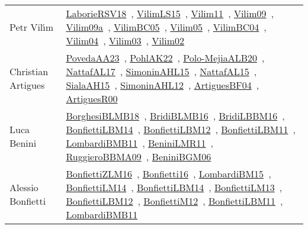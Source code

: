 {\begin{longtable}{p{4cm}p{20cm}}
Petr Vil{\'{\i}}m & \href{works/LaborieRSV18.pdf}{LaborieRSV18}~\cite{LaborieRSV18}, \href{works/VilimLS15.pdf}{VilimLS15}~\cite{VilimLS15}, \href{works/Vilim11.pdf}{Vilim11}~\cite{Vilim11}, \href{works/Vilim09.pdf}{Vilim09}~\cite{Vilim09}, \href{works/Vilim09a.pdf}{Vilim09a}~\cite{Vilim09a}, \href{works/VilimBC05.pdf}{VilimBC05}~\cite{VilimBC05}, \href{works/Vilim05.pdf}{Vilim05}~\cite{Vilim05}, \href{works/VilimBC04.pdf}{VilimBC04}~\cite{VilimBC04}, \href{works/Vilim04.pdf}{Vilim04}~\cite{Vilim04}, \href{works/Vilim03.pdf}{Vilim03}~\cite{Vilim03}, \href{works/Vilim02.pdf}{Vilim02}~\cite{Vilim02}\\
Christian Artigues & \href{works/PovedaAA23.pdf}{PovedaAA23}~\cite{PovedaAA23}, \href{works/PohlAK22.pdf}{PohlAK22}~\cite{PohlAK22}, \href{}{Polo-MejiaALB20}~\cite{Polo-MejiaALB20}, \href{works/NattafAL17.pdf}{NattafAL17}~\cite{NattafAL17}, \href{works/SimoninAHL15.pdf}{SimoninAHL15}~\cite{SimoninAHL15}, \href{works/NattafAL15.pdf}{NattafAL15}~\cite{NattafAL15}, \href{works/SialaAH15.pdf}{SialaAH15}~\cite{SialaAH15}, \href{works/SimoninAHL12.pdf}{SimoninAHL12}~\cite{SimoninAHL12}, \href{works/ArtiguesBF04.pdf}{ArtiguesBF04}~\cite{ArtiguesBF04}, \href{works/ArtiguesR00.pdf}{ArtiguesR00}~\cite{ArtiguesR00}\\
Luca Benini & \href{works/BorghesiBLMB18.pdf}{BorghesiBLMB18}~\cite{BorghesiBLMB18}, \href{works/BridiBLMB16.pdf}{BridiBLMB16}~\cite{BridiBLMB16}, \href{works/BridiLBBM16.pdf}{BridiLBBM16}~\cite{BridiLBBM16}, \href{works/BonfiettiLBM14.pdf}{BonfiettiLBM14}~\cite{BonfiettiLBM14}, \href{works/BonfiettiLBM12.pdf}{BonfiettiLBM12}~\cite{BonfiettiLBM12}, \href{works/BonfiettiLBM11.pdf}{BonfiettiLBM11}~\cite{BonfiettiLBM11}, \href{works/LombardiBMB11.pdf}{LombardiBMB11}~\cite{LombardiBMB11}, \href{works/BeniniLMR11.pdf}{BeniniLMR11}~\cite{BeniniLMR11}, \href{works/RuggieroBBMA09.pdf}{RuggieroBBMA09}~\cite{RuggieroBBMA09}, \href{works/BeniniBGM06.pdf}{BeniniBGM06}~\cite{BeniniBGM06}\\
Alessio Bonfietti & \href{works/BonfiettiZLM16.pdf}{BonfiettiZLM16}~\cite{BonfiettiZLM16}, \href{}{Bonfietti16}~\cite{Bonfietti16}, \href{works/LombardiBM15.pdf}{LombardiBM15}~\cite{LombardiBM15}, \href{works/BonfiettiLM14.pdf}{BonfiettiLM14}~\cite{BonfiettiLM14}, \href{works/BonfiettiLBM14.pdf}{BonfiettiLBM14}~\cite{BonfiettiLBM14}, \href{works/BonfiettiLM13.pdf}{BonfiettiLM13}~\cite{BonfiettiLM13}, \href{works/BonfiettiLBM12.pdf}{BonfiettiLBM12}~\cite{BonfiettiLBM12}, \href{works/BonfiettiM12.pdf}{BonfiettiM12}~\cite{BonfiettiM12}, \href{works/BonfiettiLBM11.pdf}{BonfiettiLBM11}~\cite{BonfiettiLBM11}, \href{works/LombardiBMB11.pdf}{LombardiBMB11}~\cite{LombardiBMB11}\\

\end{longtable}}
